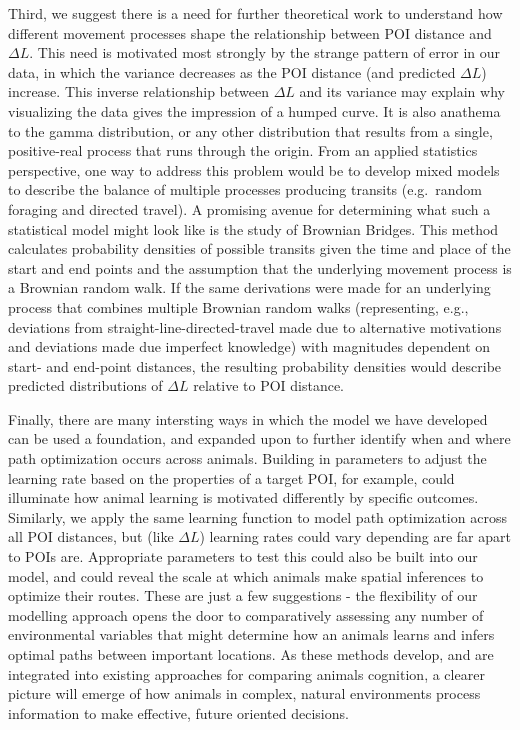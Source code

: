 \documentclass[twoside,12pt,final]{ucthesis-CA2012}
\begin{document}
\begin{ucmainmatter}
Third, we suggest there is a need for further theoretical work to understand how different movement processes shape the relationship between POI distance and \(\Delta L\). This need is motivated most strongly by the strange pattern of error in our data, in which the variance decreases as the POI distance (and predicted \(\Delta L\)) increase. This inverse relationship between \(\Delta L\) and its variance may explain why visualizing the data gives the impression of a humped curve. It is also anathema to the gamma distribution, or any other distribution that results from a single, positive-real process that runs through the origin. From an applied statistics perspective, one way to address this problem would be to develop mixed models to describe the balance of multiple processes producing transits (e.g.~random foraging and directed travel). A promising avenue for determining what such a statistical model might look like is the study of Brownian Bridges. This method calculates probability densities of possible transits given the time and place of the start and end points and the assumption that the underlying movement process is a Brownian random walk. If the same derivations were made for an underlying process that combines multiple Brownian random walks (representing, e.g., deviations from straight-line-directed-travel made due to alternative motivations and deviations made due imperfect knowledge) with magnitudes dependent on start- and end-point distances, the resulting probability densities would describe predicted distributions of \(\Delta L\) relative to POI distance.

Finally, there are many intersting ways in which the model we have developed can be used a foundation, and expanded upon to further identify when and where path optimization occurs across animals. Building in parameters to adjust the learning rate based on the properties of a target POI, for example, could illuminate how animal learning is motivated differently by specific outcomes. Similarly, we apply the same learning function to model path optimization across all POI distances, but (like \(\Delta L\)) learning rates could vary depending are far apart to POIs are. Appropriate parameters to test this could also be built into our model, and could reveal the scale at which animals make spatial inferences to optimize their routes. These are just a few suggestions - the flexibility of our modelling approach opens the door to comparatively assessing any number of environmental variables that might determine how an animals learns and infers optimal paths between important locations. As these methods develop, and are integrated into existing approaches for comparing animals cognition, a clearer picture will emerge of how animals in complex, natural environments process information to make effective, future oriented decisions.


\end{ucmainmatter}
\end{document}
